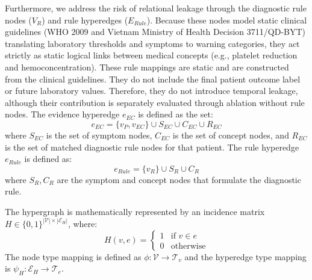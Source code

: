 \documentclass[conference]{IEEEtran}
\begin{document}
Furthermore, we address the risk of relational leakage through the diagnostic rule nodes ($V_R$) and rule hyperedges ($E_{Rule}$). Because these nodes model static clinical guidelines (WHO 2009 and Vietnam Ministry of Health Decision 3711/QD-BYT) translating laboratory thresholds and symptoms to warning categories, they act strictly as static logical links between medical concepts (e.g., platelet reduction and hemoconcentration). These rule mappings are static and are constructed from the clinical guidelines. They do not include the final patient outcome label or future laboratory values. Therefore, they do not introduce temporal leakage, although their contribution is separately evaluated through ablation without rule nodes.
The evidence hyperedge $e_{EC}$ is defined as the set:
\begin{equation}
    e_{EC} = \{ v_P, v_{EC} \} \cup S_{EC} \cup C_{EC} \cup R_{EC}
\end{equation}
where $S_{EC}$ is the set of symptom nodes, $C_{EC}$ is the set of concept nodes, and $R_{EC}$ is the set of matched diagnostic rule nodes for that patient. The rule hyperedge $e_{Rule}$ is defined as:
\begin{equation}
    e_{Rule} = \{ v_R \} \cup S_R \cup C_R
\end{equation}
where $S_R, C_R$ are the symptom and concept nodes that formulate the diagnostic rule.

The hypergraph is mathematically represented by an incidence matrix $H \in \{0, 1\}^{|\mathcal{V}| \times |\mathcal{E}_H|}$, where:
\begin{equation}
    H(v, e) = \begin{cases} 1 & \text{if } v \in e \\ 0 & \text{otherwise} \end{cases}
\end{equation}
The node type mapping is defined as $\phi: \mathcal{V} \to \mathcal{T}_v$ and the hyperedge type mapping is $\psi_H: \mathcal{E}_H \to \mathcal{T}_e$.
\end{document}
